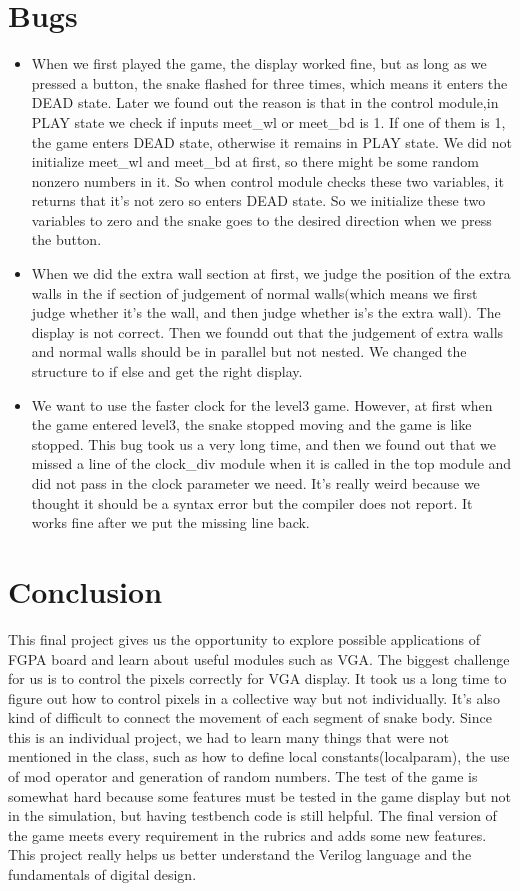 \documentclass[12pt]{article}
\begin{document}
        
\section*{Bugs}
\begin{itemize}
\item When we first played the game, the display worked fine, but as long as we pressed a button, the snake flashed for three times, which means it enters the DEAD state. Later we found out the reason is that in the control module,in PLAY state we check if inputs meet\_wl or meet\_bd is 1. If one of them is 1, the game enters DEAD state, otherwise it remains in PLAY state. We did not initialize meet\_wl and meet\_bd at first, so there might be some random nonzero numbers in it. So when control module checks these two variables, it returns that it's not zero so enters DEAD state. So we initialize these two variables to zero and the snake goes to the desired direction when we press the button.
\item When we did the extra wall section at first, we judge the position of the extra walls in the if section of judgement of normal walls$($which means we first judge whether it's the wall, and then judge whether is's the extra wall$)$. The display is not correct. Then we foundd out that the judgement of extra walls and normal walls should be in parallel but not nested. We changed the structure to if else and get the right display. 
\item We want to use the faster clock for the level3 game. However, at first when the game entered level3, the snake stopped moving and the game is like stopped. This bug took us a very long time, and then we found out that we missed a line of the clock\_div module when it is called in the top module and did not pass in the clock parameter we need. It's really weird because we thought it should be a syntax error but the compiler does not report. It works fine after we put the missing line back. 
\end{itemize}


\section*{Conclusion}
This final project gives us the opportunity to explore possible applications of FGPA board and learn about useful modules such as VGA. The biggest challenge for us is to control the pixels correctly for VGA display. It took us a long time to figure out how to control pixels in a collective way but not individually. It's also kind of difficult to connect the movement of each segment of snake body. Since this is an individual project, we had to learn many things that were not mentioned in the class, such as how to define local constants(localparam), the use of mod operator and generation of random numbers. The test of the game is somewhat hard because some features must be tested in the game display but not in the simulation, but having testbench code is still helpful. The final version of the game meets every requirement in the rubrics and adds some new features. This project really helps us better understand the Verilog language and the fundamentals of digital design. 
\end{document}
